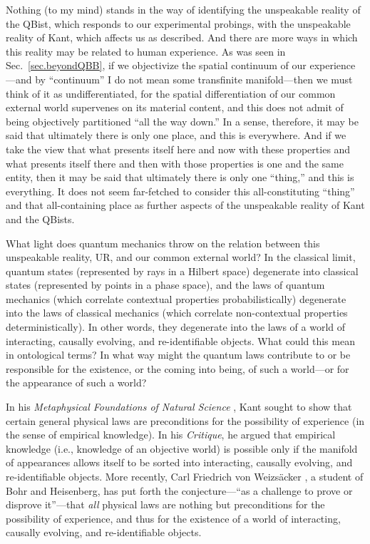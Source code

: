 \documentclass[12pt]{article}
\begin{document}
Nothing (to my mind) stands in the way of identifying the unspeakable reality of the QBist, which responds to our experimental probings, with the unspeakable reality of Kant, which affects us as described. And there are more ways in which this reality may be related to human experience. As was seen in Sec.~\ref{sec.beyondQBB}, if we objectivize the spatial continuum of our experience---and by ``continuum'' I do not mean some transfinite manifold---then we must think of it as undifferentiated, for the spatial differentiation of our common external world supervenes on its material content, and this does not admit of being objectively partitioned ``all the way down.'' In a sense, therefore, it may be said that ultimately there is only one place, and this is everywhere. And if we take the view that what presents itself here and now with these properties and what presents itself there and then with those properties is one and the same entity, then it may be said that ultimately there is only one ``thing,'' and this {is} everything. It does not seem far-fetched to consider this all-constituting ``thing'' and that all-containing place as further aspects of the unspeakable reality of Kant and the QBists.

What light does quantum mechanics throw on the relation between this unspeakable reality, UR, and our common external world? In the classical limit, quantum states (represented by rays in a Hilbert space) degenerate into classical states (represented by points in a phase space), and the laws of quantum mechanics (which correlate contextual properties {probabilistically}) degenerate into the laws of classical mechanics (which correlate non-contextual properties {deterministically}). In other words, they degenerate into the laws of a world of interacting, causally evolving, and re-identifiable objects. What could this mean in ontological terms? In what way might the quantum laws contribute to or be responsible for the existence, or the coming into being, of such a world---or for the {appearance} of such a world?

In his \emph{Metaphysical Foundations of Natural Science} \cite{KantMFNS}, Kant sought to show that certain general physical laws are preconditions for the possibility of experience (in the sense of empirical knowledge). In his \emph{Critique}, he argued that empirical knowledge (i.e., knowledge of an objective world) is possible only if the manifold of appearances allows itself to be sorted into interacting, causally evolving, and re-identifiable objects. More recently, Carl Friedrich von Weizs\"acker \cite{vW1}, a student of Bohr and Heisenberg, has put forth the conjecture---``as a challenge to prove or disprove it''---that \emph{all} physical laws are nothing but preconditions for the possibility of experience, and thus for the existence of a world of interacting, causally evolving, and re-identifiable objects.
\end{document}
